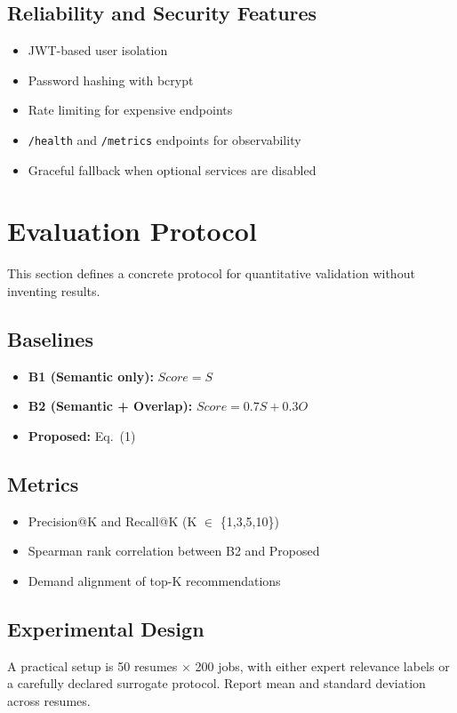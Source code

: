 \documentclass[conference]{IEEEtran}
\begin{document}
\subsection{Reliability and Security Features}
\begin{itemize}
    \item JWT-based user isolation
    \item Password hashing with bcrypt
    \item Rate limiting for expensive endpoints
    \item \texttt{/health} and \texttt{/metrics} endpoints for observability
    \item Graceful fallback when optional services are disabled
\end{itemize}

\section{Evaluation Protocol}
This section defines a concrete protocol for quantitative validation without inventing results.

\subsection{Baselines}
\begin{itemize}
    \item \textbf{B1 (Semantic only):} $Score = S$
    \item \textbf{B2 (Semantic + Overlap):} $Score = 0.7S + 0.3O$
    \item \textbf{Proposed:} Eq.~(1)
\end{itemize}

\subsection{Metrics}
\begin{itemize}
    \item Precision@K and Recall@K (K $\in$ \{1,3,5,10\})
    \item Spearman rank correlation between B2 and Proposed
    \item Demand alignment of top-K recommendations
\end{itemize}

\subsection{Experimental Design}
A practical setup is 50 resumes $\times$ 200 jobs, with either expert relevance labels or a carefully declared surrogate protocol. Report mean and standard deviation across resumes.
\end{document}
